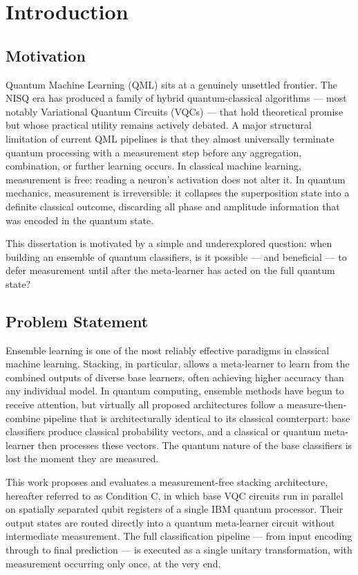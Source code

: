 \documentclass[]{UCD_CS_FYP_Report}
\begin{document}
\chapter{Introduction}

\section{Motivation}

Quantum Machine Learning (QML) sits at a genuinely unsettled frontier. The NISQ era has produced a family of hybrid quantum-classical algorithms --- most notably Variational Quantum Circuits (VQCs) --- that hold theoretical promise but whose practical utility remains actively debated. A major structural limitation of current QML pipelines is that they almost universally terminate quantum processing with a measurement step before any aggregation, combination, or further learning occurs. In classical machine learning, measurement is free: reading a neuron's activation does not alter it. In quantum mechanics, measurement is irreversible: it collapses the superposition state into a definite classical outcome, discarding all phase and amplitude information that was encoded in the quantum state.

This dissertation is motivated by a simple and underexplored question: when building an ensemble of quantum classifiers, is it possible --- and beneficial --- to defer measurement until after the meta-learner has acted on the full quantum state?

\section{Problem Statement}

Ensemble learning is one of the most reliably effective paradigms in classical machine learning. Stacking, in particular, allows a meta-learner to learn from the combined outputs of diverse base learners, often achieving higher accuracy than any individual model. In quantum computing, ensemble methods have begun to receive attention, but virtually all proposed architectures follow a measure-then-combine pipeline that is architecturally identical to its classical counterpart: base classifiers produce classical probability vectors, and a classical or quantum meta-learner then processes these vectors. The quantum nature of the base classifiers is lost the moment they are measured.

This work proposes and evaluates a measurement-free stacking architecture, hereafter referred to as Condition C, in which base VQC circuits run in parallel on spatially separated qubit registers of a single IBM quantum processor. Their output states are routed directly into a quantum meta-learner circuit without intermediate measurement. The full classification pipeline --- from input encoding through to final prediction --- is executed as a single unitary transformation, with measurement occurring only once, at the very end.
\end{document}
